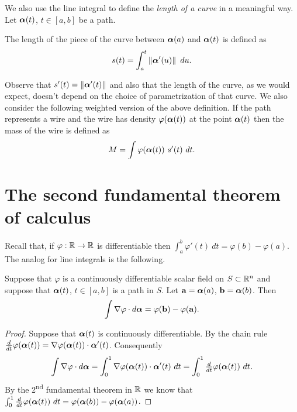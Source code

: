 We also use the line integral to define the \emph{length of a curve} in a meaningful way.
Let \(\boldsymbol{\alpha}(t)\), \(t\in [a,b]\) be a path.
\begin{definition}
    The length of the piece of the curve between \(\boldsymbol{\alpha}(a)\) and \(\boldsymbol{\alpha}(t)\) is defined as
    \[
        s(t) = \int_a^t \norm{\aalpha'(u)} \ du.
    \]
\end{definition}

Observe that \(s'(t) = \left\|\boldsymbol{\alpha}'(t)\right\| \) and also that the length of the curve, as we would expect, doesn't depend on the choice of parametrization of that curve.
We also consider the following weighted version of the above definition.
If the path represents a wire and the wire has density \(\varphi(\boldsymbol{\alpha}(t))\) at the point \(\boldsymbol{\alpha}(t)\) then the mass of the wire is defined as
\[
    M = \displaystyle\int \varphi(\boldsymbol{\alpha}(t)) \ s'(t) \ dt.
\]

\section{The second fundamental theorem of calculus}

Recall that, if \(\varphi:\mathbb{R} \to \mathbb{R}\) is differentiable then
\(\int_a^b \varphi'(t) \ dt = \varphi(b) - \varphi(a)\).
The analog for line integrals is the following.

\begin{theorem}
    Suppose that \(\varphi\) is a continuously differentiable scalar field on \(S \subset \mathbb{R}^n\)
    and suppose that \(\boldsymbol{\alpha}(t)\), \(t\in[a,b]\) is a path in \(S\).
    Let \(\mathbf{a} = \boldsymbol{\alpha}(a)\),  \(\mathbf{b} = \boldsymbol{\alpha}(b)\).
    Then
    \[
        \int \nabla \varphi \cdot d\boldsymbol{\alpha} = \varphi(\mathbf{b}) - \varphi(\mathbf{a}).
    \]
\end{theorem}

\begin{proof}
    Suppose that \(\boldsymbol{\alpha}(t)\) is continuously differentiable.
    By the chain rule \(\frac{d}{dt} \varphi(\boldsymbol{\alpha}(t)) = \nabla \varphi(\boldsymbol{\alpha}(t))\cdot \boldsymbol{\alpha}'(t)\).
    Consequently
    \[
        \int \nabla \varphi \cdot d\boldsymbol{\alpha}
        = \int_0^1 \nabla \varphi(\boldsymbol{\alpha}(t)) \cdot \boldsymbol{\alpha}'(t)\ dt
        = \int_0^1 \tfrac{d}{dt} \varphi(\boldsymbol{\alpha}(t)) \ dt.
    \]
    By the 2\textsuperscript{nd} fundamental theorem in \(\mathbb{R}\) we know that
    \(\int_0^1 \tfrac{d}{dt} \varphi(\boldsymbol{\alpha}(t)) \ dt = \varphi(\boldsymbol{\alpha}(b)) - \varphi(\boldsymbol{\alpha}(a))\).
\end{proof}

